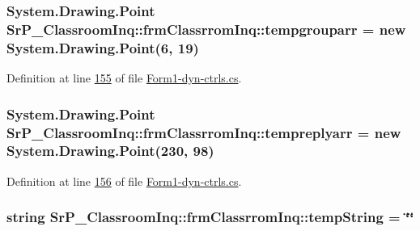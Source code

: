 \hypertarget{class_sr_p___classroom_inq_1_1frm_classrrom_inq_a6c8231644b9d1f92d08f110b003d621e}{
\subsubsection[{tempgrouparr}]{\setlength{\rightskip}{0pt plus 5cm}\-System.\-Drawing.\-Point {\bf \-Sr\-P\-\_\-\-Classroom\-Inq\-::frm\-Classrrom\-Inq\-::tempgrouparr} = new \-System.\-Drawing.\-Point(6, 19)}}
\label{class_sr_p___classroom_inq_1_1frm_classrrom_inq_a6c8231644b9d1f92d08f110b003d621e}


\-Definition at line \hyperlink{_form1-dyn-ctrls_8cs_source_l00155}{155} of file \hyperlink{_form1-dyn-ctrls_8cs_source}{\-Form1-\/dyn-\/ctrls.\-cs}.

\hypertarget{class_sr_p___classroom_inq_1_1frm_classrrom_inq_ac6007ba00a6fab2fca4b74c0e588e850}{
\subsubsection[{tempreplyarr}]{\setlength{\rightskip}{0pt plus 5cm}\-System.\-Drawing.\-Point {\bf \-Sr\-P\-\_\-\-Classroom\-Inq\-::frm\-Classrrom\-Inq\-::tempreplyarr} = new \-System.\-Drawing.\-Point(230, 98)}}
\label{class_sr_p___classroom_inq_1_1frm_classrrom_inq_ac6007ba00a6fab2fca4b74c0e588e850}


\-Definition at line \hyperlink{_form1-dyn-ctrls_8cs_source_l00156}{156} of file \hyperlink{_form1-dyn-ctrls_8cs_source}{\-Form1-\/dyn-\/ctrls.\-cs}.

\hypertarget{class_sr_p___classroom_inq_1_1frm_classrrom_inq_aaad277eaea17731f132fb18aa3560a91}{
\subsubsection[{temp\-String}]{\setlength{\rightskip}{0pt plus 5cm}string {\bf \-Sr\-P\-\_\-\-Classroom\-Inq\-::frm\-Classrrom\-Inq\-::temp\-String} = \char`\"{}\char`\"{}}}
\label{class_sr_p___classroom_inq_1_1frm_classrrom_inq_aaad277eaea17731f132fb18aa3560a91}


